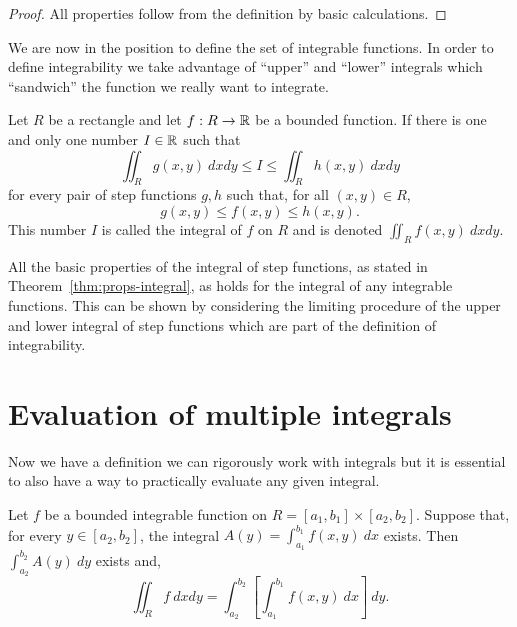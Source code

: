 \begin{proof}
    All properties follow from the definition by basic calculations.
\end{proof}



We are now in the position to define the set of integrable functions.
In order to define integrability we take advantage of ``upper'' and ``lower'' integrals which ``sandwich'' the function we really want to integrate.
%
\begin{definition}[integrability]
    Let \(R\) be a rectangle and let \(f: R \to \mathbb{R}\) be a bounded function.
    If there is one and only one number \(I\in \mathbb{R}\) such that
    \[
        \iint_{R} g(x,y) \ dx dy \leq I \leq \iint_{R} h(x,y) \ dx dy
    \]
    for every pair of step functions \( g, h\) such that, for all \((x,y)\in R\),
    \[
        g(x,y) \leq f(x,y) \leq h(x,y).
    \]
    This number \(I\) is called the integral of \(f\) on \(R\) and is denoted \(\iint_{R} f(x,y) \ dx dy\).
\end{definition}

All the basic properties of the integral of step functions, as stated in Theorem~\ref{thm:props-integral}, as holds for the integral of any integrable functions.
This can be shown by considering the limiting procedure of the upper and lower integral of step functions which are part of the definition of integrability.


\section{Evaluation of multiple integrals}

Now we have a definition we can rigorously work with integrals but it is essential to also have a way to practically evaluate any given integral.
%
\begin{theorem*}
    Let \(f\) be a bounded integrable function on  \(R = [a_1,b_1] \times [a_2,b_2]\).
    Suppose that, for every \(y\in [a_2,b_2]\), the integral \( A(y) = \int_{a_1}^{b_1} f(x,y) \ dx \) exists.
    Then \(\int_{a_2}^{b_2} A(y) \ dy\) exists and,
    \[
        \iint_{R} f \ dx dy = \int_{a_2}^{b_2} \left[ \int_{a_1}^{b_1} f(x,y) \ dx  \right] \ dy.
    \]
\end{theorem*}

